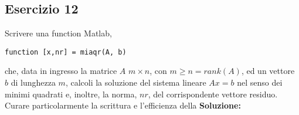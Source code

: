 \subsection{Esercizio 12}
Scrivere una function Matlab,
\begin{lstlisting}
function [x,nr] = miaqr(A, b)
\end{lstlisting}
che, data in ingresso la matrice $A$ $m \times n$, con $m \geq n = rank(A)$, ed un vettore $b$ di lunghezza
$m$, calcoli la soluzione del sistema lineare $Ax = b$ nel senso dei minimi quadrati e, inoltre, la
norma, $nr$, del corrispondente vettore residuo. Curare particolarmente la scrittura e l'efficienza della
\newline \textbf{Soluzione:}


